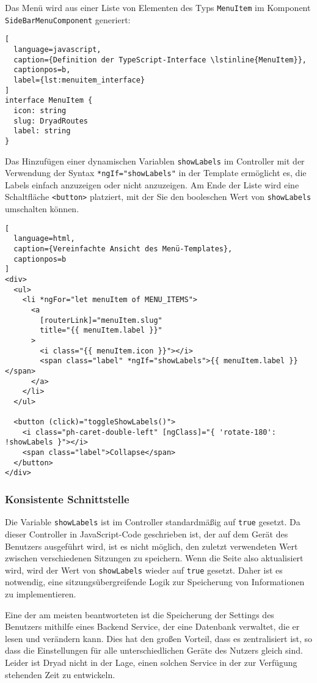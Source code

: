 Das Menü wird aus einer Liste von Elementen des Typs \lstinline{MenuItem} im Komponent \lstinline{SideBarMenuComponent} generiert:

\begin{lstlisting}[
  language=javascript,
  caption={Definition der TypeScript-Interface \lstinline{MenuItem}},
  captionpos=b,
  label={lst:menuitem_interface}
]
interface MenuItem {
  icon: string
  slug: DryadRoutes
  label: string
}
\end{lstlisting}

Das Hinzufügen einer dynamischen Variablen \lstinline{showLabels} im Controller mit der Verwendung der Syntax \lstinline{*ngIf="showLabels"} in der Template ermöglicht es, die Labels einfach anzuzeigen oder nicht anzuzeigen.
Am Ende der Liste wird eine Schaltfläche \lstinline{<button>} platziert, mit der Sie den booleschen Wert von \lstinline{showLabels} umschalten können.

\begin{lstlisting}[
  language=html,
  caption={Vereinfachte Ansicht des Menü-Templates},
  captionpos=b
]
<div>
  <ul>
    <li *ngFor="let menuItem of MENU_ITEMS">
      <a
        [routerLink]="menuItem.slug"
        title="{{ menuItem.label }}"
      >
        <i class="{{ menuItem.icon }}"></i>
        <span class="label" *ngIf="showLabels">{{ menuItem.label }}</span>
      </a>
    </li>
  </ul>

  <button (click)="toggleShowLabels()">
    <i class="ph-caret-double-left" [ngClass]="{ 'rotate-180': !showLabels }"></i>
    <span class="label">Collapse</span>
  </button>
</div>
\end{lstlisting}

\subsubsection{Konsistente Schnittstelle} \label{sec:consistent_interface}

Die Variable \lstinline{showLabels} ist im Controller standardmäßig auf \lstinline{true} gesetzt.
Da dieser Controller in JavaScript-Code geschrieben ist, der auf dem Gerät des Benutzers ausgeführt wird, ist es nicht möglich, den zuletzt verwendeten Wert zwischen verschiedenen Sitzungen zu speichern.
Wenn die Seite also aktualisiert wird, wird der Wert von \lstinline{showLabels} wieder auf \lstinline{true} gesetzt.
Daher ist es notwendig, eine sitzungsübergreifende Logik zur Speicherung von Informationen zu implementieren.

Eine der am meisten beantworteten ist die Speicherung der Settings des Benutzers mithilfe eines Backend Service, der eine Datenbank verwaltet, die er lesen und verändern kann.
Dies hat den großen Vorteil, dass es zentralisiert ist, so dass die Einstellungen für alle unterschiedlichen Geräte des Nutzers gleich sind.
Leider ist Dryad nicht in der Lage, einen solchen Service in der zur Verfügung stehenden Zeit zu entwickeln.

